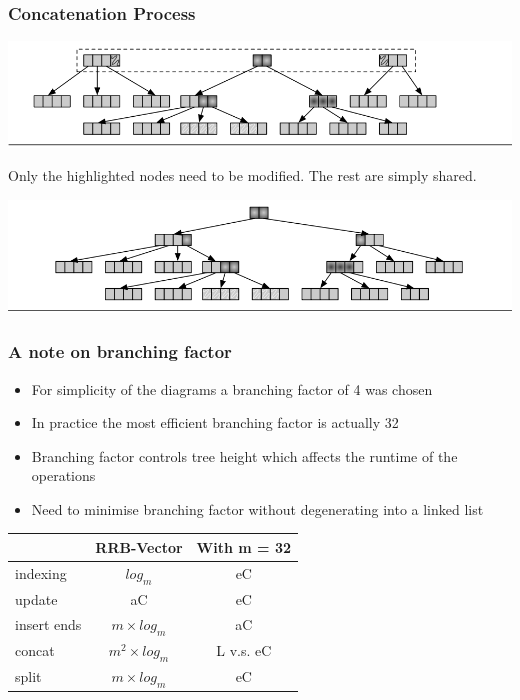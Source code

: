 \documentclass{beamer}
\begin{document}
\begin{frame}
\frametitle{Concatenation Process}

	\begin{center}
	
	\includegraphics[scale=0.3]{concat3.png}
	
	\end{center}
	
	Only the highlighted nodes need to be modified. The rest are simply shared.	
	
	\begin{center}
	
	\includegraphics[scale=0.3]{concat4.png}
	
	\end{center}
\end{frame}

\begin{frame}
\frametitle{A note on branching factor}

	\begin{itemize}
		\item For simplicity of the diagrams a branching factor of 4 was chosen
		\item In practice the most efficient branching factor is actually 32
		\item Branching factor controls tree height which affects the runtime of the operations
		\item Need to minimise branching factor without degenerating into a linked list
	\end{itemize}
	
	\begin{center}
	\begin{tabular}{| l || c | c |}
		\hline
		& RRB-Vector & With m = 32 \\
		\hline
		indexing & $ log_m $ & eC\\
		update & aC & eC \\
		insert ends & $ m \times log_m $ & aC \\
		concat & $ m^2 \times log_m $ & L v.s. eC \\
		split & $ m \times log_m $ & eC \\
		\hline
		\end{tabular}
	\end{center}


\end{frame}
\end{document}
